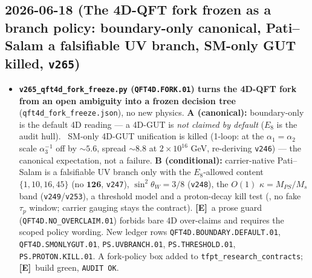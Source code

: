 \documentclass[11pt]{article}
\providecommand{\mE}{\textbf{[E]}}\providecommand{\mC}{\textbf{[C]}}
\providecommand{\vref}[1]{\texttt{#1}}
\begin{document}
\subsection*{2026-06-18 (The 4D-QFT fork frozen as a branch policy: boundary-only canonical, Pati--Salam a falsifiable UV branch, SM-only GUT killed, \texttt{v265})}
\begin{itemize}
\item \textbf{\texttt{v265\_qft4d\_fork\_freeze.py} (\texttt{QFT4D.FORK.01}) turns the 4D-QFT fork from an open
  ambiguity into a frozen decision tree} (\texttt{qft4d\_fork\_freeze.json}), no new physics. \textbf{A
  (canonical):} boundary-only is the default 4D reading --- a 4D-GUT is \emph{not claimed by default}
  ($E_8$ is the audit hull). \mX\ SM-only 4D-GUT unification is killed (1-loop: at the
  $\alpha_1{=}\alpha_2$ scale $\alpha_3^{-1}$ off by ${\sim}5.6$, spread ${\sim}8.8$ at $2{\times}10^{16}$
  GeV, re-deriving \vref{v246}) --- the canonical expectation, not a failure. \textbf{B (conditional):}
  carrier-native Pati--Salam is a falsifiable UV branch only with the $E_8$-allowed content
  $\{1,10,16,45\}$ (no $\mathbf{126}$, \vref{v247}), $\sin^2\theta_W{=}3/8$ (\vref{v248}), the $O(1)$
  $\kappa{=}M_{PS}/M_s$ band (\vref{v249}/\vref{v253}), a threshold model and a proton-decay kill test
  (\mX, no fake $\tau_p$ window; carrier gauging stays the contract). \mE\ a prose guard
  (\texttt{QFT4D.NO\_OVERCLAIM.01}) forbids bare 4D over-claims and requires the scoped policy wording. New
  ledger rows \texttt{QFT4D.BOUNDARY.DEFAULT.01}, \texttt{QFT4D.SMONLYGUT.01}, \texttt{PS.UVBRANCH.01},
  \texttt{PS.THRESHOLD.01}, \texttt{PS.PROTON.KILL.01}. A fork-policy box added to
  \texttt{tfpt\_research\_contracts}; \mE\ build green, \texttt{AUDIT OK}.
\end{itemize}
\end{document}
